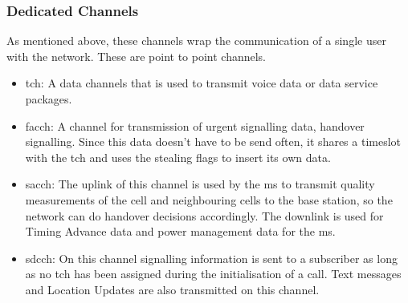 \subsubsection{Dedicated Channels}
As mentioned above, these channels wrap the communication of a single user with the network.
These are point to point channels.
\begin{itemize}
	\item \gls{tch}: A data channels that is used to transmit voice data or data service packages.
	\item \gls{facch}: A channel for transmission of urgent signalling data, \eg handover signalling.
	Since this data doesn't have to be send often, it shares a timeslot with the \gls{tch} and uses the stealing flags to insert its own data.
	\item \gls{sacch}: The uplink of this channel is used by the \gls{ms} to transmit quality measurements of the cell and neighbouring cells to the base station, so the network can do handover decisions accordingly.
	The downlink is used for Timing Advance data and power management data for the \gls{ms}.
	\item \gls{sdcch}: On this channel signalling information is sent to a subscriber as long as no \gls{tch} has been assigned during the initialisation of a call.
	Text messages and Location Updates are also transmitted on this channel.
\end{itemize}

